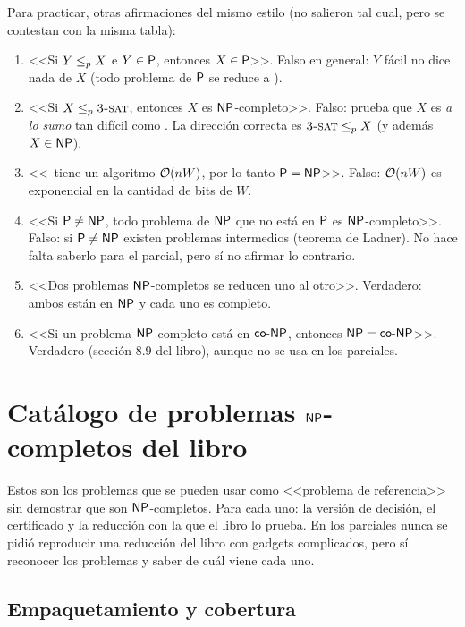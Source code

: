 Para practicar, otras afirmaciones del mismo estilo (no salieron tal cual, pero se contestan con la misma tabla):

\begin{enumerate}[label=\alph*)]
  \item <<Si $Y\le_{p} X$ e $Y\in\mathsf{P}$, entonces $X\in\mathsf{P}$>>. Falso en general: $Y$ fácil no dice nada de $X$ (todo problema de $\mathsf{P}$ se reduce a \npSAT).
  \item <<Si $X\le_{p}\textsc{3-sat}$, entonces $X$ es $\mathsf{NP}$-completo>>. Falso: prueba que $X$ es \emph{a lo sumo} tan difícil como \npTSAT. La dirección correcta es $\textsc{3-sat}\le_{p} X$ (y además $X\in\mathsf{NP}$).
  \item <<\npSS\ tiene un algoritmo $\mathcal{O}(nW)$, por lo tanto $\mathsf{P}=\mathsf{NP}$>>. Falso: $\mathcal{O}(nW)$ es exponencial en la cantidad de bits de $W$.
  \item <<Si $\mathsf{P}\ne\mathsf{NP}$, todo problema de $\mathsf{NP}$ que no está en $\mathsf{P}$ es $\mathsf{NP}$-completo>>. Falso: si $\mathsf{P}\ne\mathsf{NP}$ existen problemas intermedios (teorema de Ladner). No hace falta saberlo para el parcial, pero sí no afirmar lo contrario.
  \item <<Dos problemas $\mathsf{NP}$-completos se reducen uno al otro>>. Verdadero: ambos están en $\mathsf{NP}$ y cada uno es completo.
  \item <<Si un problema $\mathsf{NP}$-completo está en $\mathsf{co}\text{-}\mathsf{NP}$, entonces $\mathsf{NP}=\mathsf{co}\text{-}\mathsf{NP}$>>. Verdadero (sección 8.9 del libro), aunque no se usa en los parciales.
\end{enumerate}

\section{Catálogo de problemas \texorpdfstring{$\mathsf{NP}$}{NP}-completos del libro}
\label{sec:np-catalogo}

Estos son los problemas que se pueden usar como <<problema de referencia>> sin demostrar que son $\mathsf{NP}$-completos. Para cada uno: la versión de decisión, el certificado y la reducción con la que el libro lo prueba. En los parciales nunca se pidió reproducir una reducción del libro con gadgets complicados, pero sí reconocer los problemas y saber de cuál viene cada uno.

\subsection{Empaquetamiento y cobertura}

